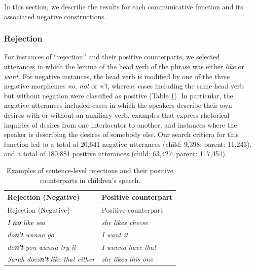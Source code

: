 \documentclass[
  english,
  man,floatsintext]{apa6}
\begin{document}
In this section, we describe the results for each communicative function and its associated negative constructions.

\hypertarget{rejection}{%
\subsubsection{Rejection}\label{rejection}}

For instances of ``rejection'' and their positive counterparts, we selected utterances in which the lemma of the head verb of the phrase was either \emph{like} or \emph{want}. For negative instances, the head verb is modified by one of the three negative morphemes \emph{no}, \emph{not} or \emph{n't}, whereas cases including the same head verb but without negation were classified as positive (Table \ref{tab:rejection}). In particular, the negative utterances included cases in which the speakers describe their own desires with or without an auxiliary verb, examples that express rhetorical inquiries of desires from one interlocutor to another, and instances where the speaker is describing the desires of somebody else. Our search critiera for this function led to a total of 20,641 negative utterances (child: 9,398; parent: 11,243), and a total of 180,881 positive utterances (child: 63,427; parent: 117,454).

\begin{longtable}[]{@{}ll@{}}
\caption{\label{tab:rejection} Examples of sentence-level rejections and their positive counterparts in children's speech.}\tabularnewline
\toprule
Rejection (Negative) & Positive counterpart \\
\midrule
\endfirsthead
\toprule
Rejection (Negative) & Positive counterpart \\
\midrule
\endhead
\emph{I} \textbf{\emph{no}} \emph{like sea} & \emph{she likes cheese} \\
\emph{do}\textbf{\emph{n't}} \emph{wanna go} & \emph{I want it} \\
\emph{do}\textbf{\emph{n't}} \emph{you wanna try it} & \emph{I wanna have that} \\
\emph{Sarah does}\textbf{\emph{n't}} \emph{like that either} & \emph{she likes this one} \\
\bottomrule
\end{longtable}
\end{document}
